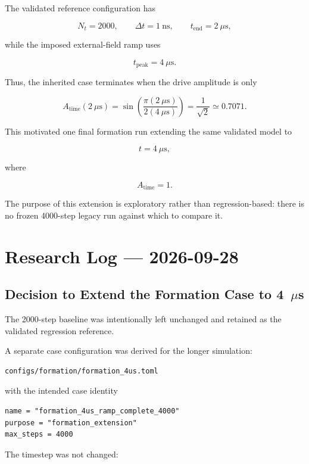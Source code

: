 \documentclass[11pt,a4paper]{article}
\begin{document}
The validated reference configuration has

\[
N_t = 2000,
\qquad
\Delta t = 1~\mathrm{ns},
\qquad
t_{\mathrm{end}}=2~\mu\mathrm{s},
\]

while the imposed external-field ramp uses

\[
t_{\mathrm{peak}} = 4~\mu\mathrm{s}.
\]

Thus, the inherited case terminates when the drive amplitude is only

\[
A_{\mathrm{time}}(2~\mu\mathrm{s})
=
\sin\left(
\frac{\pi(2~\mu\mathrm{s})}
     {2(4~\mu\mathrm{s})}
\right)
=
\frac{1}{\sqrt{2}}
\simeq 0.7071.
\]

This motivated one final formation run extending the same validated model to

\[
t=4~\mu\mathrm{s},
\]

where

\[
A_{\mathrm{time}}=1.
\]

The purpose of this extension is exploratory rather than regression-based:
there is no frozen 4000-step legacy run against which to compare it.

\section{Research Log --- 2026-09-28}

\subsection{Decision to Extend the Formation Case to 4~\texorpdfstring{$\mu$s}{us}}

The 2000-step baseline was intentionally left unchanged and retained as the
validated regression reference.

A separate case configuration was derived for the longer simulation:

\begin{lstlisting}
configs/formation/formation_4us.toml
\end{lstlisting}

with the intended case identity

\begin{lstlisting}
name = "formation_4us_ramp_complete_4000"
purpose = "formation_extension"
max_steps = 4000
\end{lstlisting}

The timestep was not changed:
\end{document}
